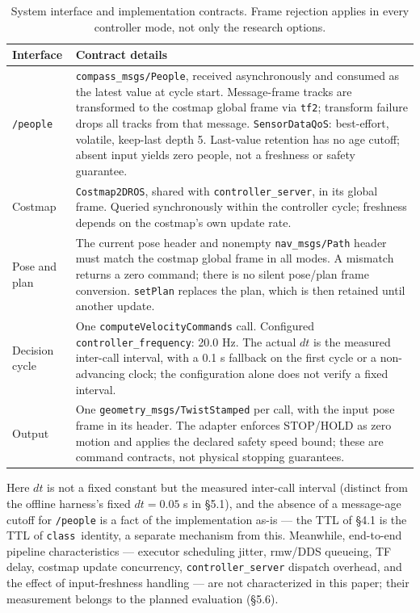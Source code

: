 \documentclass[11pt]{article}
\newcommand{\Class}{\texttt{class}}
\newcommand{\code}[1]{\texttt{#1}}
\begin{document}
\begin{table}[t]
\centering
\caption{System interface and implementation contracts. Frame rejection applies in every controller mode, not only the research options.}
\label{tab:interface}
\small
\begin{tabular}{@{}p{}p{}@{}}
\toprule
Interface & Contract details \\
\midrule
\code{/people} & \code{compass\_msgs/People}, received asynchronously and consumed as the latest value at cycle start. Message-frame tracks are transformed to the costmap global frame via \code{tf2}; transform failure drops all tracks from that message. \code{SensorDataQoS}: best-effort, volatile, keep-last depth 5. Last-value retention has no age cutoff; absent input yields zero people, not a freshness or safety guarantee. \\
\addlinespace
Costmap & \code{Costmap2DROS}, shared with \code{controller\_server}, in its global frame. Queried synchronously within the controller cycle; freshness depends on the costmap's own update rate. \\
\addlinespace
Pose and plan & The current pose header and nonempty \code{nav\_msgs/Path} header must match the costmap global frame in all modes. A mismatch returns a zero command; there is no silent pose/plan frame conversion. \code{setPlan} replaces the plan, which is then retained until another update. \\
\addlinespace
Decision cycle & One \code{computeVelocityCommands} call. Configured \code{controller\_frequency}: 20.0 Hz. The actual $dt$ is the measured inter-call interval, with a 0.1 s fallback on the first cycle or a non-advancing clock; the configuration alone does not verify a fixed interval. \\
\addlinespace
Output & One \code{geometry\_msgs/TwistStamped} per call, with the input pose frame in its header. The adapter enforces STOP/HOLD as zero motion and applies the declared safety speed bound; these are command contracts, not physical stopping guarantees. \\
\bottomrule
\end{tabular}
\end{table}

Here $dt$ is not a fixed constant but the measured inter-call interval (distinct from the offline harness's fixed $dt=0.05$ s in \S5.1), and the absence of a message-age cutoff for \code{/people} is a fact of the implementation as-is --- the TTL of \S4.1 is the TTL of \Class\ identity, a separate mechanism from this. Meanwhile, end-to-end pipeline characteristics --- executor scheduling jitter, rmw/DDS queueing, TF delay, costmap update concurrency, \code{controller\_server} dispatch overhead, and the effect of input-freshness handling --- are not characterized in this paper; their measurement belongs to the planned evaluation (\S5.6).
\end{document}
